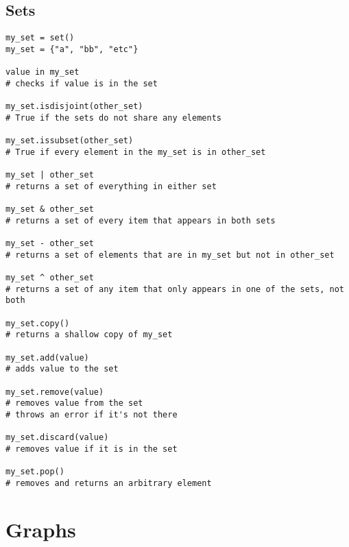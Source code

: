 \documentclass[12pt]{article}
\begin{document}
\subsection{Sets}
\begin{lstlisting}
my_set = set()
my_set = {"a", "bb", "etc"}

value in my_set
# checks if value is in the set

my_set.isdisjoint(other_set)
# True if the sets do not share any elements

my_set.issubset(other_set)
# True if every element in the my_set is in other_set

my_set | other_set
# returns a set of everything in either set

my_set & other_set
# returns a set of every item that appears in both sets

my_set - other_set
# returns a set of elements that are in my_set but not in other_set

my_set ^ other_set
# returns a set of any item that only appears in one of the sets, not both

my_set.copy()
# returns a shallow copy of my_set

my_set.add(value)
# adds value to the set

my_set.remove(value)
# removes value from the set
# throws an error if it's not there

my_set.discard(value)
# removes value if it is in the set

my_set.pop()
# removes and returns an arbitrary element
\end{lstlisting}

\section{Graphs}
\end{document}
